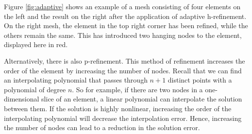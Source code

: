 Figure \ref{fig:adaptive} shows an example of a mesh consisting of four elements on the left and the result on the right after the application of adaptive h-refinement.
On the right mesh, the element in the top right corner has been refined, while the others remain the same.
This has introduced two hanging nodes to the element, displayed here in red.

Alternatively, there is also p-refinement.
This method of refinement increases the order of the element by increasing the number of nodes.
Recall that we can find an interpolating polynomial that passes through $n+1$ distinct points with a polynomial of degree $n$.
So for example, if there are two nodes in a one-dimensional slice of an element, a linear polynomial can interpolate the solution between them.
If the solution is highly nonlinear, increasing the order of the interpolating polynomial will decrease the interpolation error.
Hence, increasing the number of nodes can lead to a reduction in the solution error.
